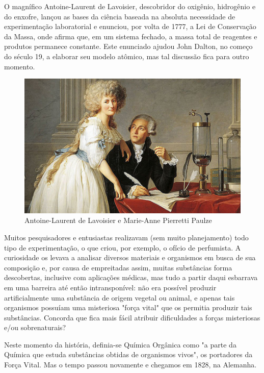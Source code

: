 \documentclass[a4paper,12pt]{book}
\begin{document}
O magnífico Antoine-Laurent de Lavoisier, descobridor do oxigênio, hidrogênio e do enxofre, lançou as bases da ciência baseada na absoluta necessidade de experimentação laboratorial e enunciou, por volta de 1777, a Lei de Conservação da Massa, onde afirma que, em um sistema fechado, a massa total de reagentes e produtos permanece constante. Este enunciado ajudou John Dalton, no começo do século 19, a elaborar seu modelo atômico, mas tal discussão fica para outro momento.

\begin{figure}[h]
	\includegraphics[width=1\linewidth]{imagens/figura 4.png} 
	\caption{Antoine-Laurent de Lavoisier e Marie-Anne Pierretti Paulze}
	\label{fig:wrapfig}
\end{figure}

Muitos pesquisadores e entusiastas realizavam (sem muito planejamento) todo tipo de experimentação, o que criou, por exemplo, o ofício de perfumista. A curiosidade os levava a analisar diversos materiais e organismos em busca de sua composição e, por causa de empreitadas assim, muitas substâncias forma descobertas, inclusive com aplicações médicas, mas tudo a partir daqui esbarrava em uma barreira até então intransponível: não era possível produzir artificialmente uma substância de origem vegetal ou animal, e apenas tais organismos possuíam uma misteriosa "força vital"  que os permitia produzir tais substâncias. Concorda que fica mais fácil atribuir dificuldades a forças misteriosas e/ou sobrenaturais?

Neste momento da história, definia-se Química Orgânica como "a parte da Química que estuda substâncias obtidas de organismos vivos", os portadores da Força Vital. Mas o tempo passou novamente e chegamos em 1828, na Alemanha.
\end{document}
